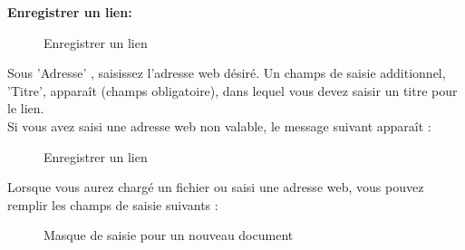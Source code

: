 \vspace{\baselineskip}

\textbf{Enregistrer un lien:} 
\begin{figure}[H]
\caption{Enregistrer un lien}
\end{figure}

Sous 'Adresse' , saisissez l'adresse web désiré. Un champs de saisie additionnel, 'Titre', apparaît  (champs obligatoire), dans lequel vous devez saisir un titre pour le lien.\\

Si vous avez saisi une adresse web non valable, le message suivant apparaît :

\begin{figure}[H]
\caption{Enregistrer un lien}
\end{figure}

\vspace{\baselineskip}

Lorsque vous aurez chargé un fichier ou saisi une adresse web, vous pouvez remplir les champs de saisie suivants :

\begin{figure}[H]
\caption{Masque de saisie pour un nouveau document}
\end{figure}

